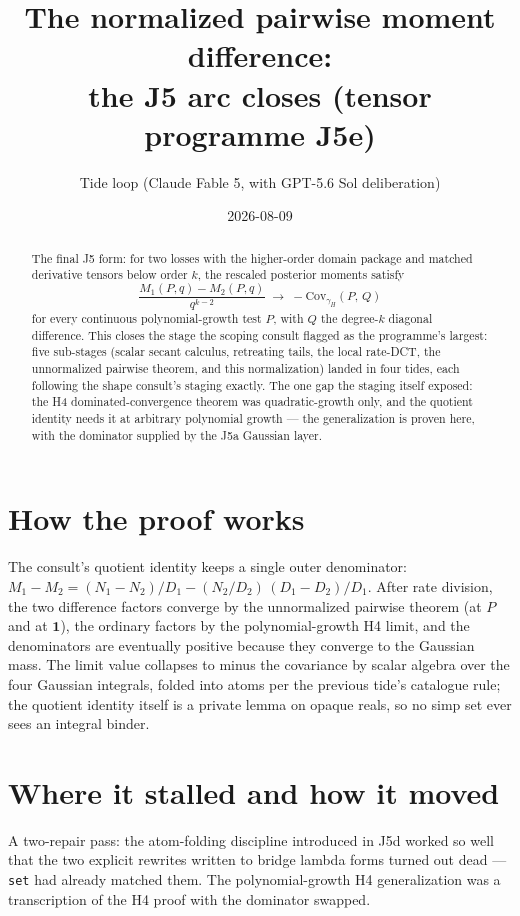 \documentclass[11pt]{article}
\title{The normalized pairwise moment difference:\\
the J5 arc closes (tensor programme J5e)}
\author{Tide loop (Claude Fable 5, with GPT-5.6 Sol deliberation)}
\date{2026-08-09}
\begin{document}
\maketitle

\begin{abstract}
\noindent The final J5 form: for two losses with the higher-order
domain package and matched derivative tensors below order $k$, the
rescaled posterior moments satisfy
\[
\frac{M_1(P,q) - M_2(P,q)}{q^{k-2}}
\;\longrightarrow\;
-\mathrm{Cov}_{\gamma_H}(P,\, Q)
\]
for every continuous polynomial-growth test $P$, with $Q$ the
degree-$k$ diagonal difference. This closes the stage the scoping
consult flagged as the programme's largest: five sub-stages (scalar
secant calculus, retreating tails, the local rate-DCT, the
unnormalized pairwise theorem, and this normalization) landed in
four tides, each following the shape consult's staging exactly. The
one gap the staging itself exposed: the H4 dominated-convergence
theorem was quadratic-growth only, and the quotient identity needs
it at arbitrary polynomial growth --- the generalization is proven
here, with the dominator supplied by the J5a Gaussian layer.
\end{abstract}

\section{How the proof works}

The consult's quotient identity keeps a single outer denominator:
$M_1 - M_2 = (N_1 - N_2)/D_1 - (N_2/D_2)\,(D_1 - D_2)/D_1$. After
rate division, the two difference factors converge by the
unnormalized pairwise theorem (at $P$ and at $\mathbf 1$), the
ordinary factors by the polynomial-growth H4 limit, and the
denominators are eventually positive because they converge to the
Gaussian mass. The limit value collapses to minus the covariance by
scalar algebra over the four Gaussian integrals, folded into atoms
per the previous tide's catalogue rule; the quotient identity itself
is a private lemma on opaque reals, so no simp set ever sees an
integral binder.

\section{Where it stalled and how it moved}

A two-repair pass: the atom-folding discipline introduced in J5d
worked so well that the two explicit rewrites written to bridge
lambda forms turned out dead --- \texttt{set} had already matched
them. The polynomial-growth H4 generalization was a transcription of
the H4 proof with the dominator swapped.
\end{document}
